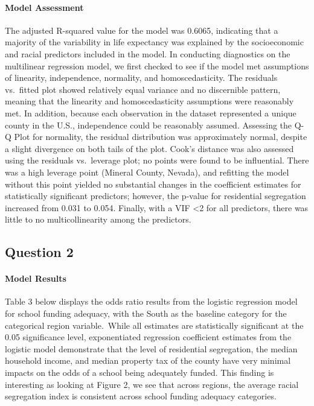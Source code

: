 \documentclass[
  10pt,
  letterpaper,
  DIV=11,
  numbers=noendperiod]{scrartcl}
\let\oldparagraph\paragraph
\renewcommand{\paragraph}[1]{\oldparagraph{#1}\mbox{}}
\begin{document}
\paragraph{Model Assessment}\label{model-assessment}

The adjusted R-squared value for the model was 0.6065, indicating that a
majority of the variability in life expectancy was explained by the
socioeconomic and racial predictors included in the model. In conducting
diagnostics on the multilinear regression model, we first checked to see
if the model met assumptions of linearity, independence, normality, and
homoscedasticity. The residuals vs.~fitted plot showed relatively equal
variance and no discernible pattern, meaning that the linearity and
homoscedasticity assumptions were reasonably met. In addition, because
each observation in the dataset represented a unique county in the U.S.,
independence could be reasonably assumed. Assessing the Q-Q Plot for
normality, the residual distribution was approximately normal, despite a
slight divergence on both tails of the plot. Cook's distance was also
assessed using the residuals vs.~leverage plot; no points were found to
be influential. There was a high leverage point (Mineral County,
Nevada), and refitting the model without this point yielded no
substantial changes in the coefficient estimates for statistically
significant predictors; however, the p-value for residential segregation
increased from 0.031 to 0.054. Finally, with a VIF \textless2 for all
predictors, there was little to no multicollinearity among the
predictors.

\subsection{Question 2}\label{question-2}

\paragraph{Model Results}\label{model-results-1}

Table 3 below displays the odds ratio results from the logistic
regression model for school funding adequacy, with the South as the
baseline category for the categorical region variable.~While all
estimates are statistically significant at the 0.05 significance level,
exponentiated regression coefficient estimates from the logistic model
demonstrate that the level of residential segregation, the median
household income, and median property tax of the county have very
minimal impacts on the odds of a school being adequately funded. This
finding is interesting as looking at Figure 2, we see that across
regions, the average racial segregation index is consistent across
school funding adequacy categories.~
\end{document}

